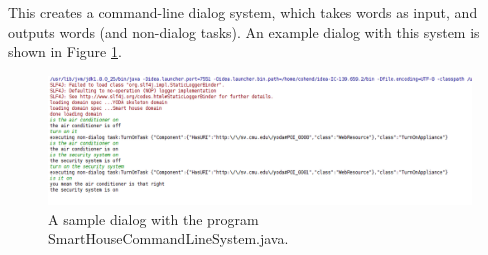 \documentclass[titlepage]{article}
\begin{document}
This creates a command-line dialog system, which takes words as input, and outputs words (and non-dialog tasks).
An example dialog with this system is shown in Figure \ref{fig:smart_house_demo}.

\begin{figure}[h!]
\centering
\includegraphics[width=\textwidth]{SmartHouseDemoDialog}
\caption{A sample dialog with the program SmartHouseCommandLineSystem.java.}
\label{fig:smart_house_demo}
\end{figure}


\clearpage
\glsaddall
\printglossary[type=main,nonumberlist]
\end{document}
